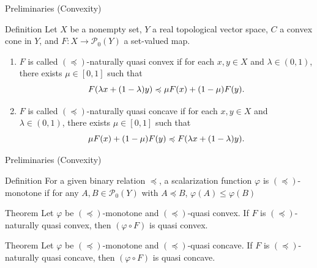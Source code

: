 \documentclass[aspectratio=169, dvipdfmx, 11pt]{beamer}
\newcommand{\pow}[1]{\mathcal{P}_{0}(#1)}
\begin{document}
\begin{frame}{Preliminaries (Convexity)}
  \begin{block}{Definition}
    Let $X$ be a nonempty set, $Y$ a real topological vector space, $C$ a convex cone in $Y$, and $F\colon X \to \pow{Y}$ a set-valued map.
    \begin{enumerate}
      \item $F$ is called $(\preccurlyeq)$-naturally quasi convex if for each $x,y \in X$ and $\lambda \in (0,1)$, there exists $\mu \in [0,1]$ such that
            \begin{equation}
              F(\lambda x + (1-\lambda)y) \preccurlyeq \mu F(x) + (1-\mu) F(y). \notag
            \end{equation}
      \item $F$ is called $(\preccurlyeq)$-naturally quasi concave if for each $x,y \in X$ and $\lambda \in (0,1)$, there exists $\mu \in [0,1]$ such that
            \begin{equation}
              \mu F(x) + (1-\mu) F(y) \preccurlyeq F(\lambda x + (1-\lambda)y). \notag
            \end{equation}
    \end{enumerate}
  \end{block}
\end{frame}

\begin{frame}{Preliminaries (Convexity)}
  \begin{block}{Definition}
    For a given binary relation $\preccurlyeq$,
    a scalarization function $\varphi$ is $(\preccurlyeq)$-monotone if
    for any $A, B \in \pow{Y}$ with
    $A \preccurlyeq B$, $\varphi (A) \leq \varphi (B)$
  \end{block}

  \begin{block}{Theorem}
    Let $\varphi$ be $(\preccurlyeq)$-monotone and $(\preccurlyeq)$-quasi convex.
    If $F$ is $(\preccurlyeq)$-naturally quasi convex,
    then $(\varphi \circ F)$ is quasi convex.
  \end{block}

  \begin{block}{Theorem}
    Let $\varphi$ be $(\preccurlyeq)$-monotone and $(\preccurlyeq)$-quasi concave.
    If $F$ is $(\preccurlyeq)$-naturally quasi concave,
    then $(\varphi \circ F)$ is quasi concave.
  \end{block}
\end{frame}

\end{document}
